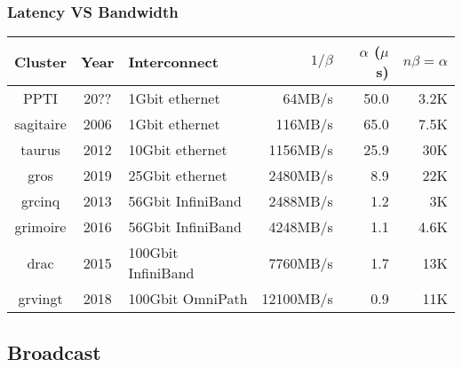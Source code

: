\documentclass[xcolor={rgb,x11names,svgnames},rgb,x11names,svgnames]{beamer}
\begin{document}

\begin{frame}
  \frametitle{Latency VS Bandwidth}
  
\footnotesize 
\begin{tabular}{|c|c|l|r|r|r|}
  \hline
  Cluster   &  Year & Interconnect & $1/\beta$ & $\alpha$ ($\mu$s) & $n\beta = \alpha$ \\
  \hline
  \hline
  PPTI      &  20?? & \phantom{00}1Gbit ethernet &    64MB/s & 50.0   & 3.2K \\
  sagitaire &  2006 & \phantom{00}1Gbit ethernet   &   116MB/s & 65.0 & 7.5K \\
  taurus    &  2012 & \phantom{0}10Gbit ethernet   &  1156MB/s & 25.9 & 30K  \\
  gros      &  2019 & \phantom{0}25Gbit ethernet   &  2480MB/s & 8.9  & 22K  \\
  \hline
  grcinq    &  2013 & \phantom{0}56Gbit InfiniBand &  2488MB/s & 1.2 & 3K    \\
  grimoire  &  2016 & \phantom{0}56Gbit InfiniBand &  4248MB/s & 1.1 & 4.6K  \\
  drac      &  2015 & 100Gbit InfiniBand        &  7760MB/s & 1.7    & 13K   \\
  \hline
  grvingt   &  2018 & 100Gbit OmniPath             & 12100MB/s & 0.9 & 11K   \\
  \hline
\end{tabular}

\end{frame}


\subsection{Broadcast}
\end{document}
